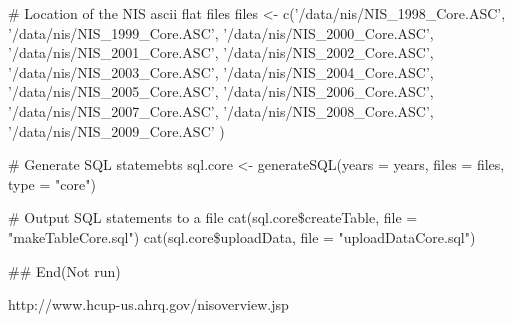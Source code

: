 \documentclass[a4paper]{book}
\begin{document}
\begin{Value}
\# Location of the NIS ascii flat files
files <- c('/data/nis/NIS\_1998\_Core.ASC',
	'/data/nis/NIS\_1999\_Core.ASC',
	'/data/nis/NIS\_2000\_Core.ASC',
	'/data/nis/NIS\_2001\_Core.ASC',
	'/data/nis/NIS\_2002\_Core.ASC',
	'/data/nis/NIS\_2003\_Core.ASC',
	'/data/nis/NIS\_2004\_Core.ASC',
	'/data/nis/NIS\_2005\_Core.ASC',
	'/data/nis/NIS\_2006\_Core.ASC',
	'/data/nis/NIS\_2007\_Core.ASC',
	'/data/nis/NIS\_2008\_Core.ASC',
	'/data/nis/NIS\_2009\_Core.ASC'
)

\# Generate SQL statemebts
sql.core <- generateSQL(years = years, files = files, type = "core")

\# Output SQL statements to a file
cat(sql.core\$createTable, file = "makeTableCore.sql")
cat(sql.core\$uploadData, file = "uploadDataCore.sql")

## End(Not run)


http://www.hcup-us.ahrq.gov/nisoverview.jsp


\end{Value}
\printindex{}
\end{document}
